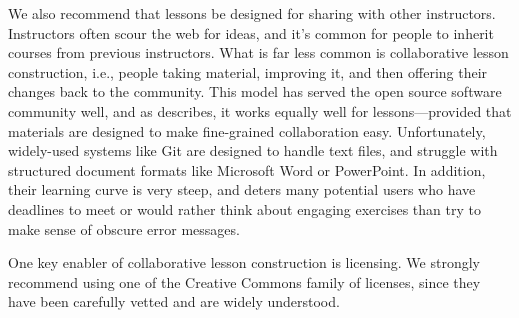 \documentclass[10pt,letterpaper]{article}
\begin{document}
We also recommend that lessons be designed for sharing with other instructors.
Instructors often scour the web for ideas, and it's common for people to inherit
courses from previous instructors.  What is far less common is collaborative
lesson construction, i.e., people taking material, improving it, and then
offering their changes back to the community.  This model has served the open
source software community well, and as \cite{Deve2018} describes, it works
equally well for lessons---provided that materials are designed to make
fine-grained collaboration easy.  Unfortunately, widely-used systems like Git
are designed to handle text files, and struggle with structured document formats
like Microsoft Word or PowerPoint.  In addition, their learning curve is very
steep, and deters many potential users who have deadlines to meet or would
rather think about engaging exercises than try to make sense of obscure error
messages.

One key enabler of collaborative lesson construction is licensing.  We strongly
recommend using one of the Creative Commons family of licenses, since they have
been carefully vetted and are widely understood.


\end{document}
